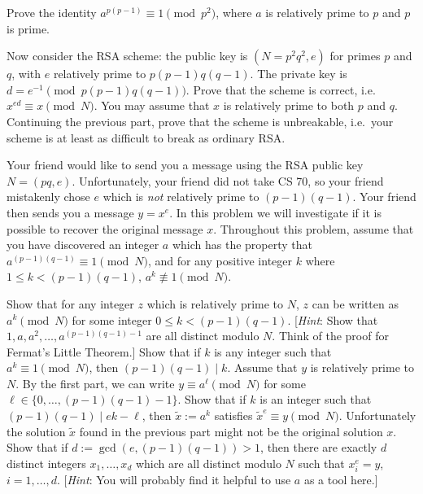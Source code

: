 
\begin{Parts}
  \Part Prove the identity $a^{p(p-1)} \equiv 1 \pmod{p^2}$, where $a$ is relatively prime to $p$ and $p$ is prime.

  \Part 
   Now consider the RSA scheme: the public key is $(N = p^2 q^2, e)$ for primes $p$ and $q$, with $e$ relatively prime to $p(p-1)q(q-1)$. The private key is $d = e^{-1} \pmod{p(p-1)q(q-1)}$.
  Prove that the scheme is correct, i.e.\ $x^{ed} \equiv x \pmod{N}$. You may assume that $x$ is relatively prime to both $p$ and $q$.
  \Part Continuing the previous part, prove that the scheme is unbreakable, i.e.\ your scheme is at least as difficult to break as ordinary RSA.
\end{Parts}




Your friend would like to send you a message using the RSA public key $N = (pq, e)$.
Unfortunately, your friend did not take CS 70, so your friend mistakenly chose $e$ which is \textit{not} relatively prime to $(p-1)(q-1)$.
Your friend then sends you a message $y = x^e$.
In this problem we will investigate if it is possible to recover the original message $x$.
Throughout this problem, assume that you have discovered an integer $a$ which has the property that $a^{(p-1)(q-1)} \equiv 1 \pmod N$, and for any positive integer $k$ where $1 \le k < (p-1)(q-1)$, $a^k \not\equiv 1 \pmod N$.
\begin{Parts}
    \Part Show that for any integer $z$ which is relatively prime to $N$, $z$ can be written as $a^k \pmod N$ for some integer $0 \le k < (p-1)(q-1)$.
    [\textit{Hint}: Show that $1, a, a^2, \dotsc, a^{(p-1)(q-1)-1}$ are all distinct modulo $N$. Think of the proof for Fermat's Little Theorem.]
    \Part Show that if $k$ is any integer such that $a^k \equiv 1 \pmod N$, then $(p-1)(q-1) \mid k$.
    \Part Assume that $y$ is relatively prime to $N$.
    By the first part, we can write $y \equiv a^\ell \pmod N$ for some $\ell \in \{0, \dotsc, (p-1)(q-1)-1\}$.
    Show that if $k$ is an integer such that $(p-1)(q-1) \mid ek - \ell$, then $\tilde{x} := a^k$ satisfies $\tilde{x}^e \equiv y \pmod N$.
    \Part Unfortunately the solution $\tilde{x}$ found in the previous part might not be the original solution $x$.
    Show that if $d := \gcd(e, (p-1)(q-1)) > 1$, then there are exactly $d$ distinct integers $x_1, \dotsc, x_d$ which are all distinct modulo $N$ such that $x_i^e = y$, $i = 1,\dotsc, d$.
    [\textit{Hint}: You will probably find it helpful to use $a$ as a tool here.]
\end{Parts}


